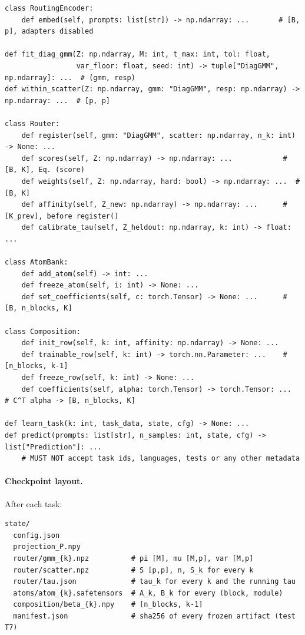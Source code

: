 \documentclass[11pt]{article}
\begin{document}
\begin{lstlisting}
class RoutingEncoder:
    def embed(self, prompts: list[str]) -> np.ndarray: ...       # [B, p], adapters disabled

def fit_diag_gmm(Z: np.ndarray, M: int, t_max: int, tol: float,
                 var_floor: float, seed: int) -> tuple["DiagGMM", np.ndarray]: ...  # (gmm, resp)
def within_scatter(Z: np.ndarray, gmm: "DiagGMM", resp: np.ndarray) -> np.ndarray: ...  # [p, p]

class Router:
    def register(self, gmm: "DiagGMM", scatter: np.ndarray, n_k: int) -> None: ...
    def scores(self, Z: np.ndarray) -> np.ndarray: ...            # [B, K], Eq. (score)
    def weights(self, Z: np.ndarray, hard: bool) -> np.ndarray: ...  # [B, K]
    def affinity(self, Z_new: np.ndarray) -> np.ndarray: ...      # [K_prev], before register()
    def calibrate_tau(self, Z_heldout: np.ndarray, k: int) -> float: ...

class AtomBank:
    def add_atom(self) -> int: ...
    def freeze_atom(self, i: int) -> None: ...
    def set_coefficients(self, c: torch.Tensor) -> None: ...      # [B, n_blocks, K]

class Composition:
    def init_row(self, k: int, affinity: np.ndarray) -> None: ...
    def trainable_row(self, k: int) -> torch.nn.Parameter: ...    # [n_blocks, k-1]
    def freeze_row(self, k: int) -> None: ...
    def coefficients(self, alpha: torch.Tensor) -> torch.Tensor: ...  # C^T alpha -> [B, n_blocks, K]

def learn_task(k: int, task_data, state, cfg) -> None: ...
def predict(prompts: list[str], n_samples: int, state, cfg) -> list["Prediction"]: ...
    # MUST NOT accept task ids, languages, tests or any other metadata
\end{lstlisting}

\paragraph{Checkpoint layout.} After each task:
\begin{lstlisting}
state/
  config.json
  projection_P.npy
  router/gmm_{k}.npz          # pi [M], mu [M,p], var [M,p]
  router/scatter.npz          # S [p,p], n, S_k for every k
  router/tau.json             # tau_k for every k and the running tau
  atoms/atom_{k}.safetensors  # A_k, B_k for every (block, module)
  composition/beta_{k}.npy    # [n_blocks, k-1]
  manifest.json               # sha256 of every frozen artifact (test T7)
\end{lstlisting}
\end{document}
